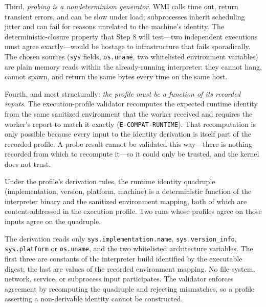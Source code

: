 Third, \emph{probing is a nondeterminism generator}. WMI calls time out, return transient errors, and can be slow under load; subprocesses inherit scheduling jitter and can fail for reasons unrelated to the machine's identity. The deterministic-closure property that Step 8 will test---two independent executions must agree exactly---would be hostage to infrastructure that fails sporadically. The chosen sources (\texttt{sys} fields, \texttt{os.uname}, two whitelisted environment variables) are plain memory reads within the already-running interpreter: they cannot hang, cannot spawn, and return the same bytes every time on the same host.

Fourth, and most structurally: \emph{the profile must be a function of its recorded inputs}. The execution-profile validator recomputes the expected runtime identity from the same sanitized environment that the worker received and requires the worker's report to match it exactly (\texttt{E-COMPAT-RUNTIME}). That recomputation is only possible because every input to the identity derivation is itself part of the recorded profile. A probe result cannot be validated this way---there is nothing recorded from which to recompute it---so it could only be trusted, and the kernel does not trust.

\begin{proposition}\label{ch07:prop:runtime-replay}
Under the profile's derivation rules, the runtime identity quadruple (implementation, version, platform, machine) is a deterministic function of the interpreter binary and the sanitized environment mapping, both of which are content-addressed in the execution profile. Two runs whose profiles agree on those inputs agree on the quadruple.
\end{proposition}

\begin{designargument}
The derivation reads only \texttt{sys.implementation.name}, \texttt{sys.version\_info}, \texttt{sys.platform} or \texttt{os.uname}, and the two whitelisted architecture variables. The first three are constants of the interpreter build identified by the executable digest; the last are values of the recorded environment mapping. No file-system, network, service, or subprocess input participates. The validator enforces agreement by recomputing the quadruple and rejecting mismatches, so a profile asserting a non-derivable identity cannot be constructed.
\end{designargument}

